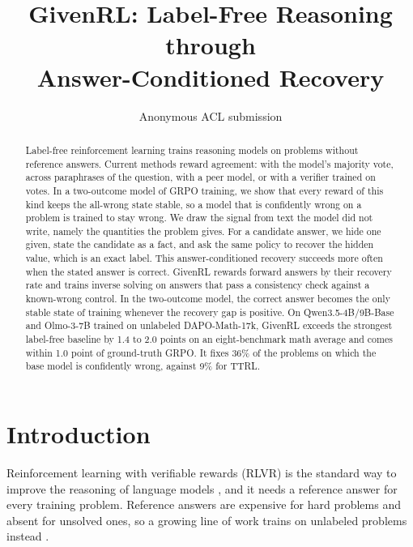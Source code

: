 \documentclass[11pt]{article}
\title{GivenRL: Label-Free Reasoning through\\Answer-Conditioned Recovery}
\author{Anonymous ACL submission}
\theoremstyle{remark}
\newcommand{\method}{GivenRL\xspace}
\begin{document}
\maketitle

\begin{abstract}
Label-free reinforcement learning trains reasoning models on problems without reference answers. Current methods reward agreement: with the model's majority vote, across paraphrases of the question, with a peer model, or with a verifier trained on votes. In a two-outcome model of GRPO training, we show that every reward of this kind keeps the all-wrong state stable, so a model that is confidently wrong on a problem is trained to stay wrong. We draw the signal from text the model did not write, namely the quantities the problem gives. For a candidate answer, we hide one given, state the candidate as a fact, and ask the same policy to recover the hidden value, which is an exact label. This answer-conditioned recovery succeeds more often when the stated answer is correct. \method rewards forward answers by their recovery rate and trains inverse solving on answers that pass a consistency check against a known-wrong control. In the two-outcome model, the correct answer becomes the only stable state of training whenever the recovery gap is positive. On Qwen3.5-4B/9B-Base and Olmo-3-7B trained on unlabeled DAPO-Math-17k, \method exceeds the strongest label-free baseline by 1.4 to 2.0 points on an eight-benchmark math average and comes within 1.0 point of ground-truth GRPO. It fixes 36\% of the problems on which the base model is confidently wrong, against 9\% for TTRL.
\end{abstract}

\section{Introduction}

Reinforcement learning with verifiable rewards (RLVR) is the standard way to improve the reasoning of language models \citep{shao2024deepseekmath,guo2025deepseekr1}, and it needs a reference answer for every training problem. Reference answers are expensive for hard problems and absent for unsolved ones, so a growing line of work trains on unlabeled problems instead \citep{zuo2025ttrl,prabhudesai2025rent,zhao2026intuitor}.
\end{document}

